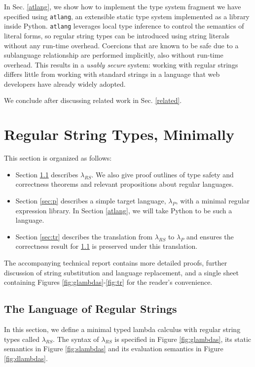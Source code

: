 \documentclass[9pt]{sig-alternate}
\theoremstyle{definition}
\newcommand{\lambdas}{\lambda_{RS}}
\newcommand{\lambdap}{\lambda_P}
\begin{document}
In Sec. \ref{atlang}, we show how to implement the type system fragment we have specified  using \texttt{atlang}, an extensible static type system implemented as a library inside Python. \texttt{atlang} leverages local type inference to control the semantics of literal forms, so regular string types can be introduced using string literals without any run-time overhead. Coercions that are known to be  safe due to a sublanguage relationship are performed implicitly, also without run-time overhead. This results in a \emph{usably secure} system: working with regular strings differs little from working with standard strings in a language that web developers have already widely adopted.

We conclude after discussing related work in Sec. \ref{related}.

\section{Regular String Types, Minimally}\label{calculus}
\noindent
This section is organized as follows:
\begin{itemize}
\item Section \ref{sec:rs} describes $\lambda_{RS}$. We also give proof outlines of  type safety and correctness theorems and relevant propositions about regular languages.
\item Section \ref{sec:p} describes a simple target language, $\lambdap$, with a minimal regular expression library. In Section \ref{atlang}, we will take Python to be such a language.
\item Section \ref{sec:tr} describes the translation from $\lambdas$ to $\lambdap$ and ensures the correctness result for \ref{sec:rs} is preserved under this translation. 
\end{itemize}

The accompanying technical report \cite{psptr} contains more detailed proofs, further discussion of string substitution and language replacement, and
a single sheet containing Figures \ref{fig:glambdas}-\ref{fig:tr} for the reader's convenience.

\subsection{The Language of Regular Strings}\label{sec:rs}
In this section, we define a minimal typed lambda calculus with regular string types called $\lambda_{RS}$. The syntax of $\lambda_{RS}$ is specified in Figure \ref{fig:glambdas}, its static semantics in Figure \ref{fig:slambdas} and its evaluation semantics in Figure \ref{fig:dlambdas}.
\end{document}
